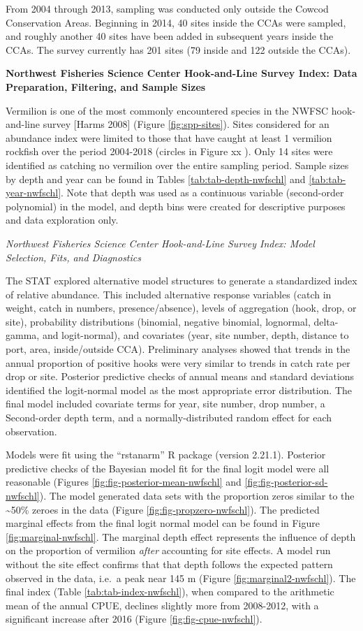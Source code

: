 \documentclass[11pt,
  english,
  a4paper,
]{article}
\begin{document}
From 2004 through 2013, sampling was conducted only outside the Cowcod Conservation Areas. Beginning in 2014, 40 sites inside the CCAs were sampled, and roughly another 40 sites have been added in subsequent years inside the CCAs. The survey currently has 201 sites (79 inside and 122 outside the CCAs).

\textbf{Northwest Fisheries Science Center Hook-and-Line Survey Index: Data Preparation, Filtering, and Sample Sizes}

Vermilion is one of the most commonly encountered species in the NWFSC hook-and-line survey {[}Harms 2008{]} (Figure \ref{fig:spp-sites}). Sites considered for an abundance index were limited to those that have caught at least 1 vermilion rockfish over the period 2004-2018 (circles in Figure xx ). Only 14 sites were identified as catching no vermilion over the entire sampling period. Sample sizes by depth and year can be found in Tables \ref{tab:tab-depth-nwfschl} and \ref{tab:tab-year-nwfschl}. Note that depth was used as a continuous variable (second-order polynomial) in the model, and depth bins were created for descriptive purposes and data exploration only.

\emph{Northwest Fisheries Science Center Hook-and-Line Survey Index: Model Selection, Fits, and Diagnostics}

The STAT explored alternative model structures to generate a standardized index of relative abundance. This included alternative response variables (catch in weight, catch in numbers, presence/absence), levels of aggregation (hook, drop, or site), probability distributions (binomial, negative binomial, lognormal, delta-gamma, and logit-normal), and covariates (year, site number, depth, distance to port, area, inside/outside CCA). Preliminary analyses showed that trends in the annual proportion of positive hooks were very similar to trends in catch rate per drop or site. Posterior predictive checks of annual means and standard deviations identified the logit-normal model as the most appropriate error distribution. The final model included covariate terms for year, site number, drop number, a Second-order depth term, and a normally-distributed random effect for each observation.

Models were fit using the ``rstanarm'' R package (version 2.21.1). Posterior predictive checks of the Bayesian model fit for the final logit model were all reasonable (Figures \ref{fig:fig-posterior-mean-nwfschl} and \ref{fig:fig-posterior-sd-nwfschl}). The model generated data sets with the proportion zeros similar to the \textasciitilde50\% zeroes in the data (Figure \ref{fig:fig-propzero-nwfschl}). The predicted marginal effects from the final logit normal model can be found in Figure \ref{fig:marginal-nwfschl}. The marginal depth effect represents the influence of depth on the proportion of vermilion \emph{after} accounting for site effects. A model run without the site effect confirms that that depth follows the expected pattern observed in the data, i.e.~a peak near 145 m (Figure \ref{fig:marginal2-nwfschl}). The final index (Table \ref{tab:tab-index-nwfschl}), when compared to the arithmetic mean of the annual CPUE, declines slightly more from 2008-2012, with a significant increase after 2016 (Figure \ref{fig:fig-cpue-nwfschl}).
\end{document}
